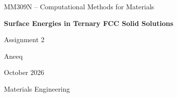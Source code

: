 \begin{titlepage}
    \centering

    {\Large MM309N -- Computational Methods for Materials\par}
    \vspace{2cm}

    {\huge\bfseries Surface Energies in Ternary FCC
    Solid Solutions\par}
    \vspace{1.5cm}

    {\large Assignment 2\par}
    \vspace{2cm}

    {\large Aneeq\par}
    \vspace{0.5cm}

    {\large October 2026\par}

    \vfill

    {\large Materials Engineering\par}

\end{titlepage}

